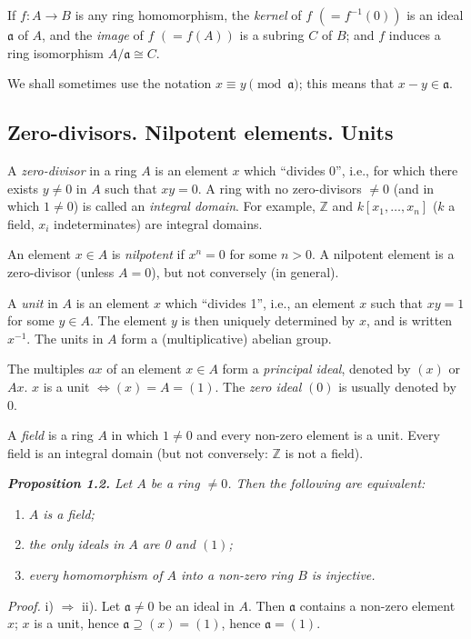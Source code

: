 If $f:A\longrightarrow B$ is any ring homomorphism, the \emph{kernel} of $f$ $(=f^{-1}(0))$ is an ideal
$\mathfrak a$ of $A$, and the \emph{image} of $f$ $(=f(A))$ is a subring $C$ of $B$; and $f$ induces a ring
isomorphism $A/\mathfrak a\cong C$.

We shall sometimes use the notation $x\equiv y\pmod{\mathfrak a}$; this means that
$x-y\in\mathfrak a$.

\subsection{Zero-divisors. Nilpotent elements. Units}

A \emph{zero-divisor} in a ring $A$ is an element $x$ which ``divides 0'', i.e., for which there
exists $y\ne0$ in $A$ such that $xy=0$.  A ring with no zero-divisors $\ne0$ (and in
which $1\ne0$) is called an \emph{integral domain}.  For example, $\mathbb Z$ and $k[x_1,\ldots,x_n]$
($k$ a field, $x_i$ indeterminates) are integral domains.

An element $x\in A$ is \emph{nilpotent} if $x^n=0$ for some $n>0$.  A nilpotent
element is a zero-divisor (unless $A=0$), but not conversely (in general).

A \emph{unit} in $A$ is an element $x$ which ``divides 1'', i.e., an element $x$ such that
$xy=1$ for some $y\in A$.  The element $y$ is then uniquely determined by $x$, and is
written $x^{-1}$.  The units in $A$ form a (multiplicative) abelian group.

The multiples $ax$ of an element $x\in A$ form a \emph{principal ideal}, denoted by $(x)$
or $Ax$.  $x$ is a unit $\Longleftrightarrow (x)=A=(1)$.  The \emph{zero ideal} $(0)$ is usually denoted by 0.

A \emph{field} is a ring $A$ in which $1\ne0$ and every non-zero element is a unit.
Every field is an integral domain (but not conversely: $\mathbb Z$ is not a field).

\medskip
\noindent\textit{\textbf{Proposition 1.2.} Let $A$ be a ring $\ne0$.  Then the following are equivalent:}
\begin{enumerate}
\renewcommand{\labelenumi}{\roman{enumi})}
\item \textit{$A$ is a field;}
\item \textit{the only ideals in $A$ are 0 and $(1)$;}
\item \textit{every homomorphism of $A$ into a non-zero ring $B$ is injective.}
\end{enumerate}
\noindent\emph{Proof.} i) $\Rightarrow$ ii).  Let $\mathfrak a\ne0$ be an ideal in $A$.  Then $\mathfrak a$ contains a non-zero
element $x$; $x$ is a unit, hence $\mathfrak a\supseteq(x)=(1)$, hence $\mathfrak a=(1)$.

